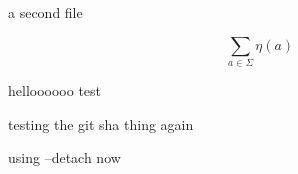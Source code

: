 \documentclass{article}
\begin{document}
a second file

\[
    \sum_{a\in\Sigma} \eta(a)
\]

helloooooo test

testing the git sha thing again

using --detach now
\end{document}
